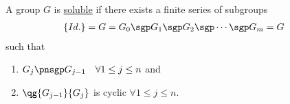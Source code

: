 \documentclass[a4paper]{article}
\begin{document}
\begin{tdefinition}
  A group \( G \) is \ul{soluble} if there exists a finite series of subgroups \begin{align*}
    \left\{ Id. \right\} = G &= G_0 \sgp G_1 \sgp G_2 \sgp \cdots \sgp G_m = G
  \end{align*}
  such that \begin{enumerate}
    \item \( G_j \pnsgp G_{j-1} \quad \forall 1\le j\le n \) and
    \item \( \qg{G_{j-1}}{G_j} \) is cyclic \( \forall 1\le j\le n  \).
  \end{enumerate}
\end{tdefinition}
\end{document}
